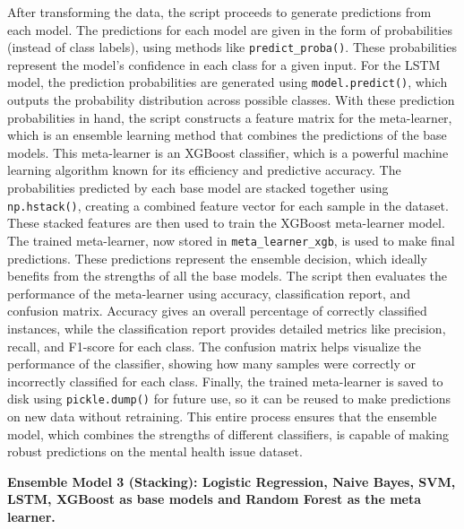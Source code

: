 \noindent
After transforming the data, the script proceeds to generate predictions from each model. The predictions for each model are given in the form of probabilities (instead of class labels), using methods like \texttt{predict\_proba()}. These probabilities represent the model’s confidence in each class for a given input. For the LSTM model, the prediction probabilities are generated using \texttt{model.predict()}, which outputs the probability distribution across possible classes. With these prediction probabilities in hand, the script constructs a feature matrix for the meta-learner, which is an ensemble learning method that combines the predictions of the base models. This meta-learner is an XGBoost classifier, which is a powerful machine learning algorithm known for its efficiency and predictive accuracy. The probabilities predicted by each base model are stacked together using \texttt{np.hstack()}, creating a combined feature vector for each sample in the dataset. These stacked features are then used to train the XGBoost meta-learner model. The trained meta-learner, now stored in \texttt{meta\_learner\_xgb}, is used to make final predictions. These predictions represent the ensemble decision, which ideally benefits from the strengths of all the base models. The script then evaluates the performance of the meta-learner using accuracy, classification report, and confusion matrix. Accuracy gives an overall percentage of correctly classified instances, while the classification report provides detailed metrics like precision, recall, and F1-score for each class. The confusion matrix helps visualize the performance of the classifier, showing how many samples were correctly or incorrectly classified for each class. Finally, the trained meta-learner is saved to disk using \texttt{pickle.dump()} for future use, so it can be reused to make predictions on new data without retraining. This entire process ensures that the ensemble model, which combines the strengths of different classifiers, is capable of making robust predictions on the mental health issue dataset.


\vspace{1em}

\noindent
\textbf{Ensemble Model 3 (Stacking): Logistic Regression, Naive Bayes, SVM, LSTM, XGBoost as base models and Random Forest as the meta learner. }

